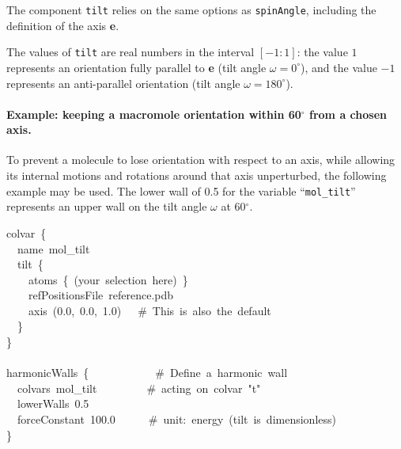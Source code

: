 The component \texttt{tilt} relies on the same options as \texttt{spinAngle}, including the definition of the axis \textbf{e}.

\begin{cvcoptions}
\item %
\item %
\item %
\item %
\end{cvcoptions}

The values of \texttt{tilt} are real numbers in the interval $[-1:1]$: the value $1$ represents an orientation fully parallel to \textbf{e} (tilt angle $\omega = 0^\circ$), and the value $-1$ represents an anti-parallel orientation (tilt angle $\omega = 180^\circ$).

\paragraph*{Example: keeping a macromole orientation within 60$^\circ$ from a chosen axis.}  To prevent a molecule to lose orientation with respect to an axis, while allowing its internal motions and rotations around that axis unperturbed, the following example may be used.
The lower wall of 0.5 for the variable ``\texttt{mol\_tilt}'' represents an upper wall on the tilt angle $\omega$ at 60$^\circ$.

\begin{cvexampleinput}
\-colvar~\{\\
\-~~name~mol\_tilt\\
\-~~tilt~\{\\
\-~~~~atoms~\{~(your~selection~here)~\}\\
\-~~~~refPositionsFile~reference.pdb\\
\-~~~~axis~(0.0,~0.0,~1.0)~~~\#~This~is~also~the~default\\
\-~~\}\\
\-\}\\
\-\\
\-harmonicWalls~\{~~~~~~~~~~~~\#~Define~a~harmonic~wall\\
\-~~colvars~mol\_tilt~~~~~~~~~\#~acting~on~colvar~"t"\\
\-~~lowerWalls~0.5\\
\-~~forceConstant~100.0~~~~~~\#~unit:~energy~(tilt~is~dimensionless)\\
\-\}\\
\end{cvexampleinput}


